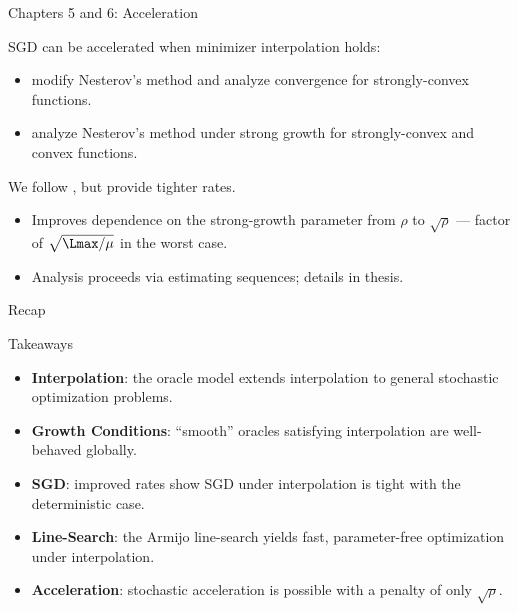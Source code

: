 \documentclass[mathserif,notheorems, hyperref={colorlinks, citecolor=blue, urlcolor=blue, linkcolor=blue}]{beamer}
\begin{document}


    \begin{frame}{Chapters 5 and 6: Acceleration}

       SGD can be accelerated when minimizer interpolation holds:
       \begin{itemize}
           \item \citet{liu2020accelerating} modify Nesterov's method and analyze convergence for strongly-convex functions. 
      \vspace{1ex}
           \item \citet{vaswani2019fast} analyze Nesterov's method under strong growth for strongly-convex and convex functions. 
       \end{itemize}

      \vspace{2ex}
      We follow \citet{vaswani2019fast}, but provide tighter rates. 
      \begin{itemize}
          \item Improves dependence on the strong-growth parameter from \( \rho \) to \( \sqrt{\rho} \) --- factor of \( \sqrt{\Lmax / \mu} \) in the worst case. 
        \vspace{1ex}
          \item Analysis proceeds via estimating sequences; details in thesis.  
      \end{itemize}
        
    \end{frame}

    \begin{frame}{Recap}
       \begin{center}
         \vspace{-2ex}
         \Large Takeaways
         \vspace{1ex}
       \end{center}

        \begin{itemize}
            \item \textbf{Interpolation}: the oracle model extends interpolation to general stochastic optimization problems. 
                \vspace{1ex}
            \item \textbf{Growth Conditions}: ``smooth'' oracles satisfying interpolation are well-behaved globally. 
                \vspace{1ex}
            \item \textbf{SGD}: improved rates show SGD under interpolation is tight with the deterministic case. 
                \vspace{1ex}
            \item \textbf{Line-Search}: the Armijo line-search yields fast, parameter-free optimization under interpolation.  
                \vspace{1ex}
            \item \textbf{Acceleration}: stochastic acceleration is possible with a penalty of only \( \sqrt{\rho} \). 
        \end{itemize}
    \end{frame}
    
\end{document}
